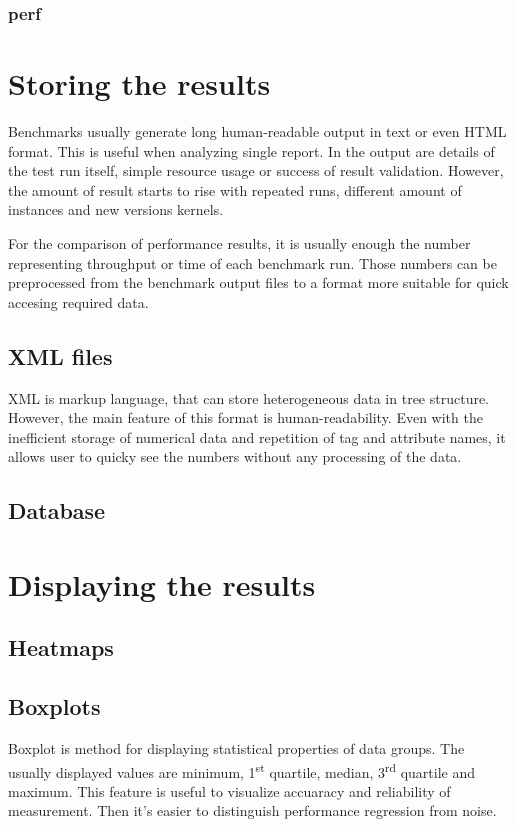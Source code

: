 \subsection{perf}


\chapter{Storing the results}
Benchmarks usually generate long human-readable output in text or even HTML
format. This is useful when analyzing single report. In the output are details
of the test run itself, simple resource usage or success of result validation.
However, the amount of result starts to rise with repeated runs, different
amount of instances and new versions kernels.

For the comparison of performance results, it is usually enough the number
representing throughput or time of each benchmark run. Those numbers can be
preprocessed from the benchmark output files to a format more suitable for quick
accesing required data.

\section{XML files}
XML is markup language, that can store heterogeneous data in tree structure.
However, the main feature of this format is human-readability. Even with the
inefficient storage of numerical data and repetition of tag and attribute names,
it allows user to quicky see the numbers without any processing of the data.

\section{Database}


\chapter{Displaying the results}

\section{Heatmaps}

\section{Boxplots}
Boxplot is method for displaying statistical properties of data groups. The
usually displayed values are minimum, 1\textsuperscript{st} quartile, median,
3\textsuperscript{rd} quartile and maximum.
This feature is useful to visualize accuaracy and reliability of measurement.
Then it's easier to distinguish performance regression from noise.

